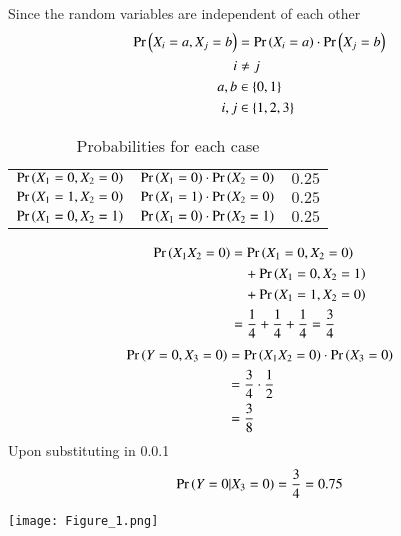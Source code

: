 \documentclass[journal,12pt,twocolumn]{IEEEtran}
\begin{document}
Since the random variables are independent of each other
\begin{align}
    \Pr\left(X_i = a, X_j = b\right) &= \Pr\left(X_i=a\right) \cdot \Pr\left(X_j=b\right)\\
    i &\neq j\\
    a,b &\in \{0,1\}\\
    i,j &\in \{1,2,3\}
\end{align}
\begin{table}[h!]
    \centering
    \resizebox{\columnwidth}{!}
    {
    \begin{tabular}{|c|c|c|}
    \hline
         $\Pr\left(X_1=0,X_2=0\right)$& $\Pr\left(X_1=0\right)\cdot\Pr\left(X_2=0\right)$&$0.25 $\\
         
         $\Pr\left(X_1=1,X_2=0\right)$&$\Pr\left(X_1=1\right)\cdot\Pr\left(X_2=0\right)$&$0.25$ \\ 
         $\Pr\left(X_1=0,X_2=1\right)$&$\Pr\left(X_1=0\right)\cdot\Pr\left(X_2=1\right)$&$0.25$\\
         \hline
    \end{tabular}
    }
    
    \caption{Probabilities for each case}
    \label{tab:my_label}
\end{table}
\begin{align}
\nonumber
\Pr\left(X_1X_2=0\right) &= \Pr\left(X_1=0,X_2=0\right) \\ \nonumber
    &\quad+ \Pr\left(X_1=0,X_2=1\right)\\ &\quad+ \Pr\left(X_1=1,X_2=0\right)\\
    &=\frac{1}{4} +\frac{1}{4} + \frac{1}{4}= \frac{3}{4}
\end{align}
\begin{align}
    \Pr\left(Y=0,X_3=0\right) &= \Pr\left(X_1X_2=0\right)\cdot\Pr\left(X_3=0\right)\\
    &=\frac{3}{4} \cdot \frac{1}{2}\\
    &=\frac{3}{8}
\end{align}
Upon substituting in 0.0.1
\begin{align}
    \Pr\left(Y=0|X_3=0\right) = \dfrac{3}{4} = 0.75
\end{align}

\texttt{[image: Figure\_1.png]}
 
\end{document}
